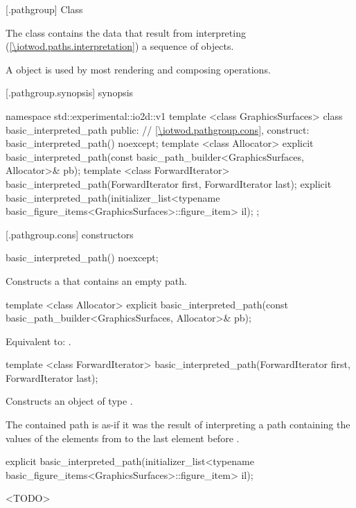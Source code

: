  [\iotwod.pathgroup] {Class }

\pnum
{}%
The class  contains the data that result from interpreting (\ref{\iotwod.paths.interpretation}) a sequence of  objects.

\pnum
A  object is used by most rendering and composing operations.

 [\iotwod.pathgroup.synopsis] { synopsis}

\begin{codeblock}
namespace std::experimental::io2d::v1 {
  template <class GraphicsSurfaces>
  class basic_interpreted_path {
  public:
    // \ref{\iotwod.pathgroup.cons}, construct:
    basic_interpreted_path() noexcept;
    template <class Allocator>
    explicit basic_interpreted_path(const basic_path_builder<GraphicsSurfaces, Allocator>& pb);
    template <class ForwardIterator>
    basic_interpreted_path(ForwardIterator first, ForwardIterator last);
    explicit basic_interpreted_path(initializer_list<typename
      basic_figure_items<GraphicsSurfaces>::figure_item> il);
  };
}
\end{codeblock}

 [\iotwod.pathgroup.cons] { constructors}

%
\begin{itemdecl}
basic_interpreted_path() noexcept;
\end{itemdecl}
\begin{itemdescr}
\pnum
\effects
Constructs a  that contains an empty path.
\end{itemdescr}

%
\begin{itemdecl}
template <class Allocator>
explicit basic_interpreted_path(const basic_path_builder<GraphicsSurfaces, Allocator>& pb);
\end{itemdecl}
\begin{itemdescr}
\pnum
\effects
Equivalent to: .	
\end{itemdescr}

%
\begin{itemdecl}
template <class ForwardIterator>
basic_interpreted_path(ForwardIterator first, ForwardIterator last);
\end{itemdecl}
\begin{itemdescr}
\pnum
\effects
Constructs an object of type .

\pnum
The contained path is as-if it was the result of interpreting a path containing the values of the elements from  to the last element before .
\end{itemdescr}

%
\begin{itemdecl}
explicit basic_interpreted_path(initializer_list<typename
  basic_figure_items<GraphicsSurfaces>::figure_item> il);
\end{itemdecl}
\begin{itemdescr}
\pnum
\effects
<TODO>
\end{itemdescr}

